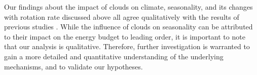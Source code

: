 Our findings about the impact of clouds on climate, seasonality, and its changes with rotation rate discussed above all agree qualitatively with the results of previous studies \citep{faulk2017-Effects, guendelman2022-Key, jansen2019-Climates}. While the influence of clouds on seasonality can be attributed to their impact on the energy budget to leading order, it is important to note that our analysis is qualitative. Therefore, further investigation is warranted to gain a more detailed and quantitative understanding of the underlying mechanisms, and to validate our hypotheses.
